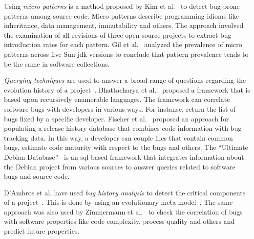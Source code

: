 \documentclass[conference]{IEEEtran}
\begin{document}
Using {\it micro patterns} is a method proposed by Kim et al.~\cite{KPW06}
to detect bug-prone patterns among source code. Micro patterns describe programming
idioms like inheritance, data management, immutability and others. The approach involved
the examination of all revisions of three open-source projects to extract bug
introduction rates for each pattern. Gil et al.~\cite{GM05} analyzed the
prevalence of micro patterns across five Sun {\sc jdk} versions to conclude that
pattern prevalence tends to be the same in software collections.

{\it Querying techniques} are used to answer a broad range of questions
regarding the evolution history of a project~\cite{HG05}. Bhattacharya et
al.~\cite{BN11, B11} proposed a framework that is based upon
recursively enumerable languages. The framework can correlate software
bugs with developers in various ways. For instanse, return the list of
bugs fixed by a specific developer. Fischer et al.~\cite{FPG03} proposed
an approach for populating a release history database that combines code
information with bug tracking data. In this way, a developer can couple files
that contain common bugs, estimate code maturity with respect to the bugs
and others. The ``Ultimate Debian Database''~\cite{NZ10} is an {\sc sql}-based
framework that integrates information about the Debian project from various
sources to answer queries related to software bugs and source code.

D'Ambros et al. have used {\it bug history analysis} to detect
the critical components of a project~\cite{D08}. This is done by using an
evolutionary meta-model~\cite{DL08}. The same approach was
also used by Zimmermann et al.~\cite{ZNA08} to check the correlation
of bugs with software properties like code complexity, process quality and others
and predict future properties.
\end{document}
